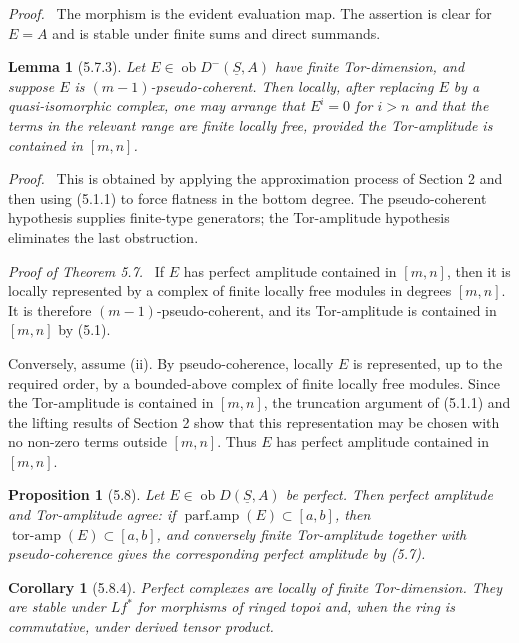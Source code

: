\documentclass[13pt]{extarticle}
\newcommand{\uS}{\underline S}
\newcommand{\ob}{\operatorname{ob}}
\newenvironment{prooftext}[1][Proof]{\par\noindent\emph{#1.}\ }{\par\medskip}
\newtheorem*{lemma*}{Lemma}
\newtheorem*{proposition*}{Proposition}
\newtheorem*{corollary*}{Corollary}
\begin{document}
\begin{prooftext}
The morphism is the evident evaluation map. The assertion is clear for $E=A$ and is stable under finite sums and direct summands.
\end{prooftext}

\begin{lemma*}[5.7.3]
Let $E\in\ob D^-(\uS,A)$ have finite Tor-dimension, and suppose $E$ is $(m-1)$-pseudo-coherent. Then locally, after replacing $E$ by a quasi-isomorphic complex, one may arrange that $E^i=0$ for $i>n$ and that the terms in the relevant range are finite locally free, provided the Tor-amplitude is contained in $[m,n]$.
\end{lemma*}

\begin{prooftext}
This is obtained by applying the approximation process of Section 2 and then using (5.1.1) to force flatness in the bottom degree. The pseudo-coherent hypothesis supplies finite-type generators; the Tor-amplitude hypothesis eliminates the last obstruction.
\end{prooftext}

\begin{prooftext}[Proof of Theorem 5.7]
If $E$ has perfect amplitude contained in $[m,n]$, then it is locally represented by a complex of finite locally free modules in degrees $[m,n]$. It is therefore $(m-1)$-pseudo-coherent, and its Tor-amplitude is contained in $[m,n]$ by (5.1).

Conversely, assume (ii). By pseudo-coherence, locally $E$ is represented, up to the required order, by a bounded-above complex of finite locally free modules. Since the Tor-amplitude is contained in $[m,n]$, the truncation argument of (5.1.1) and the lifting results of Section 2 show that this representation may be chosen with no non-zero terms outside $[m,n]$. Thus $E$ has perfect amplitude contained in $[m,n]$.
\end{prooftext}

\begin{proposition*}[5.8]
Let $E\in\ob D(\uS,A)$ be perfect. Then perfect amplitude and Tor-amplitude agree: if $\operatorname{parf.amp}(E)\subset[a,b]$, then $\operatorname{tor\text{-}amp}(E)\subset[a,b]$, and conversely finite Tor-amplitude together with pseudo-coherence gives the corresponding perfect amplitude by (5.7).
\end{proposition*}

\begin{corollary*}[5.8.4]
Perfect complexes are locally of finite Tor-dimension. They are stable under $Lf^*$ for morphisms of ringed topoi and, when the ring is commutative, under derived tensor product.
\end{corollary*}
\end{document}
